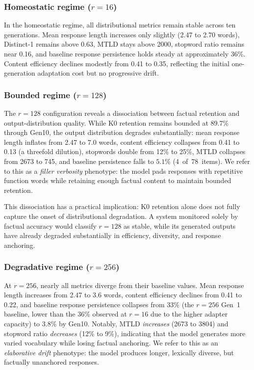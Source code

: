 \documentclass[a4paper,fleqn]{cas-dc}
\newif\ifshowchanges
\newcommand{\rev}[1]{\ifshowchanges{\color{blue}#1}\else{#1}\fi}
\begin{document}
\subsubsection{Homeostatic regime ($r=16$)}
In the homeostatic regime, all distributional metrics remain stable across ten
generations. Mean response length increases only slightly (2.47 to 2.70 words),
Distinct-1 remains above 0.63, MTLD stays above 2000, stopword ratio remains
near 0.16, and baseline response persistence holds steady at approximately 36\%.
Content efficiency declines modestly from 0.41 to 0.35, reflecting the initial
one-generation adaptation cost but no progressive drift.

\subsubsection{Bounded regime ($r=128$)}\label{sec:dissociation}
The $r=128$ configuration reveals a dissociation between factual retention and
output-distribution quality. While K0 retention remains bounded at 89.7\% through
Gen10, the output distribution degrades substantially: mean response length
inflates from 2.47 to 7.0 words, content efficiency collapses from 0.41 to 0.13
(a threefold dilution), stopwords double from 12\% to 25\%, MTLD collapses from
2673 to 745, and baseline persistence falls to \rev{$5.1$\% (4~of~78~items)}. We refer to this as a
\textit{filler verbosity} phenotype: the model pads responses with repetitive
function words while retaining enough factual content to maintain bounded
retention.

This dissociation has a practical implication: K0 retention alone does not fully
capture the onset of distributional degradation. A system monitored solely by
factual accuracy would classify $r=128$ as stable, while its generated outputs
have already degraded substantially in efficiency, diversity, and response
anchoring.

\subsubsection{Degradative regime ($r=256$)}
At $r=256$, nearly all metrics diverge from their baseline values. Mean response
length increases from 2.47 to 3.6 words, content efficiency declines from 0.41
to 0.22, and baseline response persistence collapses from \rev{33\% (the $r=256$ Gen~1 baseline, lower than the 36\% observed at $r=16$ due to the higher adapter capacity)} to 3.8\% by
Gen10. Notably, MTLD \textit{increases} (2673 to 3804) and stopword ratio
\textit{decreases} (12\% to 9\%), indicating that the model generates more
varied vocabulary while losing factual anchoring. We refer to this as an
\textit{elaborative drift} phenotype: the model produces longer, lexically
diverse, but factually unanchored responses.
\end{document}
